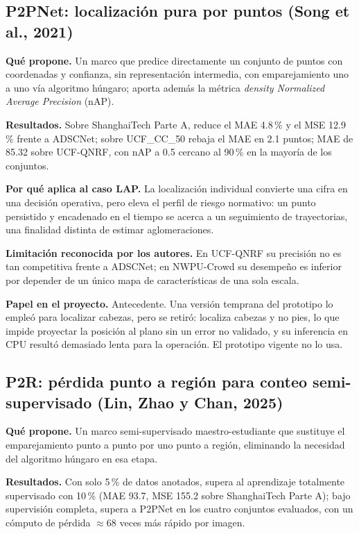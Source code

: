 \subsection{P2PNet: localización pura por puntos (Song et al., 2021)}
\label{subsec:p2pnet}

\textbf{Qué propone.} Un marco que predice directamente un conjunto de puntos con
coordenadas y confianza, sin representación intermedia, con emparejamiento uno a uno vía
algoritmo húngaro; aporta además la métrica \emph{density Normalized Average Precision}
(nAP).

\textbf{Resultados.} Sobre ShanghaiTech Parte A, reduce el MAE 4.8\,\% y el MSE 12.9\,\%
frente a ADSCNet; sobre UCF\_CC\_50 rebaja el MAE en 2.1 puntos; MAE de 85.32 sobre
UCF-QNRF, con nAP a 0.5 cercano al 90\,\% en la mayoría de los conjuntos.

\textbf{Por qué aplica al caso LAP.} La localización individual convierte una cifra en una
decisión operativa, pero eleva el perfil de riesgo normativo: un punto persistido y encadenado
en el tiempo se acerca a un seguimiento de trayectorias, una finalidad distinta de estimar
aglomeraciones.

\textbf{Limitación reconocida por los autores.} En UCF-QNRF su precisión no es tan
competitiva frente a ADSCNet; en NWPU-Crowd su desempeño es inferior por depender de un
único mapa de características de una sola escala.

\textbf{Papel en el proyecto.} Antecedente. Una versión temprana del prototipo lo empleó para
localizar cabezas, pero se retiró: localiza cabezas y no pies, lo que impide proyectar la posición
al plano sin un error no validado, y su inferencia en CPU resultó demasiado lenta para la
operación. El prototipo vigente no lo usa.

\subsection{P2R: pérdida punto a región para conteo semi-supervisado (Lin, Zhao y Chan,
2025)}
\label{subsec:p2r}

\textbf{Qué propone.} Un marco semi-supervisado maestro-estudiante que sustituye el
emparejamiento punto a punto por uno punto a región, eliminando la necesidad del algoritmo
húngaro en esa etapa.

\textbf{Resultados.} Con solo 5\,\% de datos anotados, supera al aprendizaje totalmente
supervisado con 10\,\% (MAE 93.7, MSE 155.2 sobre ShanghaiTech Parte A); bajo supervisión
completa, supera a P2PNet en los cuatro conjuntos evaluados, con un cómputo de pérdida
$\approx$68 veces más rápido por imagen.

